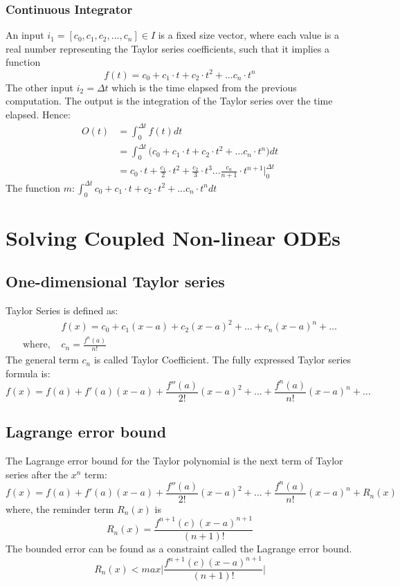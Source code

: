 \documentclass[twoside,a4paper,12pt]{article}
\theoremstyle{definition}
\begin{document}
\subsubsection{Continuous Integrator}
An input $i_1 = [c_0, c_1, c_2, ... , c_n ] \in I$ is a fixed size vector, where each value is a real number representing the Taylor series coefficients, such that it implies a function
\begin{equation}
	 f(t) = c_0 + c_1 \cdot t + c_2 \cdot t^2 + ... c_n \cdot t^n
\end{equation}
The other input $i_2 = \Delta t$ which is the time elapsed from the previous computation.
The output is the integration of the Taylor series over the time elapsed. Hence:
\begin{align}
	O(t) &= \int_{0}^{\Delta t} f(t) dt \\
	&= \int_{0}^{\Delta t} \bigg( c_0 + c_1 \cdot t + c_2 \cdot t^2 + ... c_n \cdot t^n \bigg) dt \\
	&= c_0 \cdot t + \frac{c_1}{2} \cdot t^2 + \frac{c_2}{3} \cdot t^3 ... \frac{c_n}{n+1} \cdot t^{n+1} \bigg|_0^{\Delta t}
\end{align}
The function $m:  \int_{0}^{\Delta t} c_0 + c_1 \cdot t + c_2 \cdot t^2 + ... c_n \cdot t^n dt$


\section{Solving Coupled Non-linear ODEs}
\subsection{One-dimensional Taylor series}
Taylor Series is defined as:
\begin{align}
& f(x)  = c_0 + c_1(x-a) + c_2(x-a)^2 + \dots + c_n(x-a)^n + \dots \\
\text{where, } & c_n  = \frac{f^n(a)}{n!} 
\end{align}
The general term $c_n$ is called Taylor Coefficient. The fully expressed Taylor series formula is:
\begin{equation}
	f(x) = f(a) + f'(a)(x-a) + \frac{f''(a)}{2!}(x-a)^2 + \dots + \frac{f^n(a)}{n!}(x-a)^n + \dots
\end{equation}
\subsection{Lagrange error bound}
The Lagrange error bound for the Taylor polynomial is the next term of Taylor series after the $x^n$ term:
\begin{equation}
	f(x) = f(a) + f'(a)(x-a) + \frac{f''(a)}{2!}(x-a)^2 + \dots + \frac{f^n(a)}{n!}(x-a)^n + R_n(x)
\end{equation}
where, the reminder term $R_n(x)$ is
\begin{equation}
	R_n(x) = \frac{f^{n+1}(c)(x-a)^{n+1}}{(n+1)!}
\end{equation}
The bounded error can be found as a constraint called the Lagrange error bound.
\begin{equation}
	R_n(x) < max \bigg| \frac{f^{n+1}(c)(x-a)^{n+1}}{(n+1)!} \bigg|
\end{equation}
\end{document}
